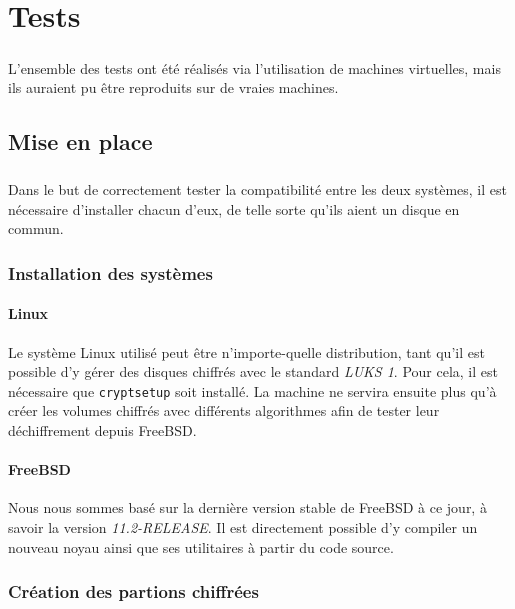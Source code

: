 \chapter{Tests}

\paragraph{}
L'ensemble des tests ont été réalisés via l'utilisation de machines virtuelles,
mais ils auraient pu être reproduits sur de vraies machines.

\section{Mise en place}

\paragraph{}
Dans le but de correctement tester la compatibilité entre les deux systèmes, il
est nécessaire d'installer chacun d'eux, de telle sorte qu'ils aient un disque
en commun.

\subsection{Installation des systèmes}
\subsubsection{Linux}
Le système Linux utilisé peut être n'importe-quelle distribution, tant qu'il est
possible d'y gérer des disques chiffrés avec le standard \textit{LUKS 1}. Pour
cela, il est nécessaire que \texttt{cryptsetup} soit installé. La machine ne
servira ensuite plus qu'à créer les volumes chiffrés avec différents algorithmes
afin de tester leur déchiffrement depuis FreeBSD.
\subsubsection{FreeBSD}
Nous nous sommes basé sur la dernière version stable de FreeBSD à ce jour, à
savoir la version \textit{11.2-RELEASE}. Il est directement possible d'y
compiler un nouveau noyau ainsi que ses utilitaires à partir du code source.

\subsection{Création des partions chiffrées}
